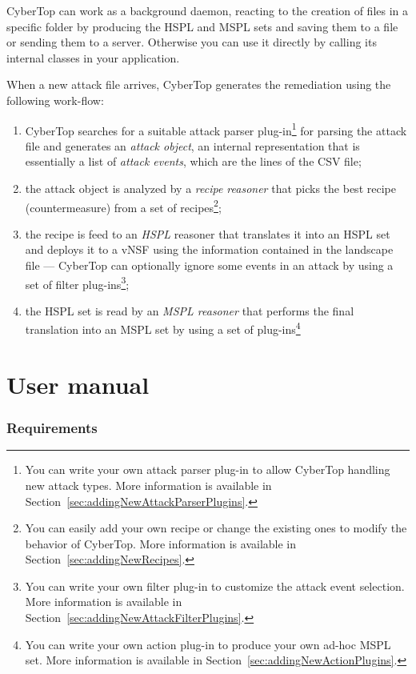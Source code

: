 \documentclass{scrartcl}
\begin{document}
CyberTop can work as a background daemon, reacting to the creation of files in a specific folder by producing the HSPL and MSPL sets and saving them to a file or sending them to a server. Otherwise you can use it directly by calling its internal classes in your application.

When a new attack file arrives, CyberTop generates the remediation using the following work-flow:

\begin{enumerate}
	\item CyberTop searches for a suitable attack parser plug-in\footnote{You can write your own attack parser plug-in to allow CyberTop handling new attack types. More information is available in Section~\ref{sec:addingNewAttackParserPlugins}.} for parsing the attack file and generates an \emph{attack object}, an internal representation that is essentially a list of \emph{attack events}, which are the lines of the CSV file;
	\item the attack object is analyzed by a \emph{recipe reasoner} that picks the best recipe (countermeasure) from a set of recipes\footnote{You can easily add your own recipe or change the existing ones to modify the behavior of CyberTop. More information is available in Section~\ref{sec:addingNewRecipes}.};
	\item the recipe is feed to an \emph{HSPL} reasoner that translates it into an HSPL set and deploys it to a vNSF using the information contained in the landscape file --- CyberTop can optionally ignore some events in an attack by using a set of filter plug-ins\footnote{You can write your own filter plug-in to customize the attack event selection. More information is available in Section~\ref{sec:addingNewAttackFilterPlugins}.};
	\item the HSPL set is read by an \emph{MSPL reasoner} that performs the final translation into an MSPL set by using a set of plug-ins\footnote{You can write your own action plug-in to produce your own ad-hoc MSPL set. More information is available in Section~\ref{sec:addingNewActionPlugins}.}
\end{enumerate}

\cleardoublepage
\part{User manual}

\section{Requirements}
\end{document}
